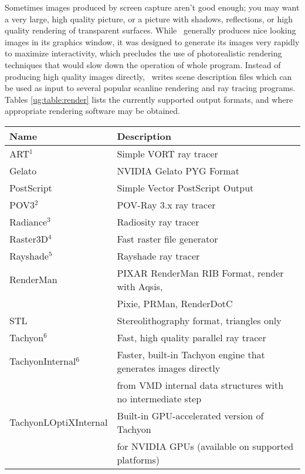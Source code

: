 Sometimes images produced by screen capture aren't good enough; 
you may want a very large, high quality picture, or a picture 
with shadows, reflections, or high quality rendering of transparent surfaces.  
While \VMD\ generally produces nice looking images in its graphics window,
it was designed to generate its images very rapidly to maximize
interactivity, which precludes the use of photorealistic rendering 
techniques that would slow down the operation of whole program.
Instead of producing high quality images directly, \VMD\ writes 
scene description files which can be used as input to several popular 
scanline rendering and ray tracing programs.  
Tables \ref{ug:table:render} lists the currently 
supported output formats, and where appropriate rendering software 
may be obtained.

\begin{table}[htb]
\begin{tabular}{|l|l|} 
  \hline
  Name & Description \\ 
  \hline\hline
  ART$^1$                  & Simple VORT ray tracer \\
  Gelato                   & NVIDIA Gelato PYG Format \\
  PostScript               & Simple Vector PostScript Output \\
  POV3$^2$                 & POV-Ray 3.x ray tracer \\
  Radiance$^3$             & Radiosity ray tracer \\
  Raster3D$^4$             & Fast raster file generator \\
  Rayshade$^5$             & Rayshade ray tracer \\
  RenderMan                & PIXAR RenderMan RIB Format, render with Aqsis, \\
                           & Pixie, PRMan, RenderDotC \\
  STL                      & Stereolithography format, triangles only \\
  Tachyon$^6$              & Fast, high quality parallel ray tracer \\
  TachyonInternal$^6$      & Faster, built-in Tachyon engine that generates images directly \\
                           & from VMD internal data structures with no intermediate step \\
  TachyonLOptiXInternal    & Built-in GPU-accelerated version of Tachyon \\
                           & for NVIDIA GPUs (available on supported platforms) \\

\end{tabular}
\end{table}
